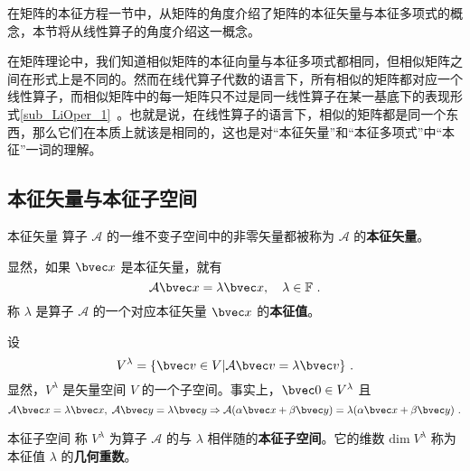 
在矩阵的本征方程一节中，从矩阵的角度介绍了矩阵的本征矢量与本征多项式的概念，本节将从线性算子的角度介绍这一概念。

在矩阵理论中，我们知道相似矩阵的本征向量与本征多项式都相同，但相似矩阵之间在形式上是不同的。然而在线代算子代数的语言下，所有相似的矩阵都对应一个线性算子，而相似矩阵中的每一矩阵只不过是同一线性算子在某一基底下的表现形式\autoref{sub_LiOper_1}~。也就是说，在线性算子的语言下，相似的矩阵都是同一个东西，那么它们在本质上就该是相同的，这也是对“本征矢量”和“本征多项式”中“本征”一词的理解。

\subsection{本征矢量与本征子空间}
\begin{definition}{本征矢量}
算子 $\mathcal{A}$ 的一维不变子空间中的非零矢量都被称为 $\mathcal{A}$ 的\textbf{本征矢量}。
\end{definition}
显然，如果 $\bvec x$ 是本征矢量，就有
\begin{equation}\label{eq_EigVM_1}
\mathcal{A}\bvec x=\lambda \bvec x,\quad \lambda\in\mathbb{F}~.
\end{equation}
称 $\lambda$ 是算子 $\mathcal{A}$ 的一个对应本征矢量 $\bvec x$ 的\textbf{本征值}。

设
\begin{equation}
V^{\lambda}=\{\bvec v\in V|\mathcal{A}\bvec v=\lambda \bvec v\}~.
\end{equation}
显然，$V^{\lambda}$ 是矢量空间 $V$ 的一个子空间。事实上，$\bvec 0\in V^{\lambda}$ 且
\begin{equation}
\mathcal{A}\bvec x=\lambda \bvec x,\;\mathcal{A}\bvec y=\lambda \bvec y\Rightarrow\mathcal{A}(\alpha\bvec x+\beta\bvec y)=\lambda(\alpha\bvec x+\beta \bvec y)~.
\end{equation}
\begin{definition}{本征子空间}\label{def_EigVM_1}
称 $V^{\lambda}$ 为算子 $\mathcal{A}$ 的与 $\lambda$ 相伴随的\textbf{本征子空间}。它的维数 $\mathrm{dim}\;V^{\lambda}$ 称为本征值 $\lambda$ 的\textbf{几何重数}。 
\end{definition}
